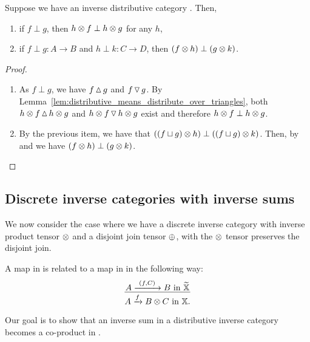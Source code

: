 \begin{corollary}\label{cor:inverse_product_and_disjointness}
  Suppose we have an inverse distributive category \X. Then,
  \begin{enumerate}[{(}i{)}]
    \item if $f \perp g$, then $h\otimes f \perp h\otimes  g$ for any $h$,
    \item  if  $f\perp g : A\to B$ and $h \perp k: C\to D$, then $(f\otimes h)\perp (g\otimes k)$.
   \end{enumerate}
\end{corollary}
\begin{proof}
  \prepprooflist
  \begin{enumerate}[{(}i{)}]
    \item As $f\perp g$, we have $f\operatorname{\vartriangle} g$ and $f\operatorname{\triangledown} g$. By
      Lemma~\ref{lem:distributive_means_distribute_over_triangles}, both $h\otimes f \operatorname{\vartriangle} h\otimes g$ and
      $h\otimes f \operatorname{\triangledown} h\otimes g$ exist and therefore $h\otimes f \perp h\otimes g$.
    \item By the previous item, we have that $((f\sqcup g)\otimes h) \perp ((f\sqcup g)\otimes k)$. Then, by
       and  we have $(f\otimes h)\perp (g\otimes k)$.
  \end{enumerate}
\end{proof}

\subsection{Discrete inverse categories with inverse sums} %
\label{sub:discrete_inverse_categories_with_inverse_sums}

We now consider the case where we have a discrete inverse category with inverse product
tensor $\otimes$ and a disjoint join tensor $\oplus$, with the $\otimes$ tensor preserves the
disjoint join.

A map in \Xt is related to a map in \X in the following way:
\[
  \infer{A\xrightarrow{f} B\*C \text{ in }\X.}{A \xrightarrow{\ (f,C)\ } B \text{ in } \Xt}
\]

Our goal is to show that an inverse sum in a distributive inverse category becomes a co-product
in \Xt.

